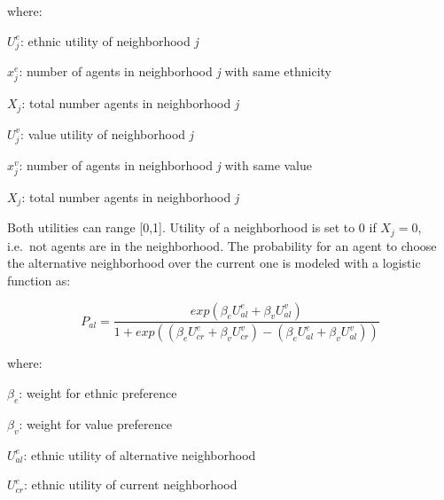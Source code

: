 \documentclass[
]{article}
\begin{document}
where:

\par

\(U^e_j\): ethnic utility of neighborhood \textit{j}

\par

\(x^e_j\): number of agents in neighborhood \textit{j} with same
ethnicity

\par

\(X_j\): total number agents in neighborhood \textit{j}

\par

\(U^v_j\): value utility of neighborhood \textit{j}

\par

\(x^v_j\): number of agents in neighborhood \textit{j} with same value

\par

\(X_j\): total number agents in neighborhood \textit{j}

\par

Both utilities can range {[}0,1{]}. Utility of a neighborhood is set to
0 if \(X_j = 0\), i.e.~not agents are in the neighborhood. The
probability for an agent to choose the alternative neighborhood over the
current one is modeled with a logistic function as:

\begin{equation}
    P_{al} = \frac{exp(\beta_e U^e_{al} + \beta_v U^v_{al})}{1 + exp((\beta_e U^e_{cr} + \beta_v U^v_{cr}) - (\beta_e U^e_{al} + \beta_v U^v_{al}))}
    \label{eq:lgst}
\end{equation}

where:

\par

\(\beta_e\): weight for ethnic preference

\par

\(\beta_v\): weight for value preference

\par

\(U^e_{al}\): ethnic utility of alternative neighborhood

\par

\(U^e_{cr}\): ethnic utility of current neighborhood
\end{document}
